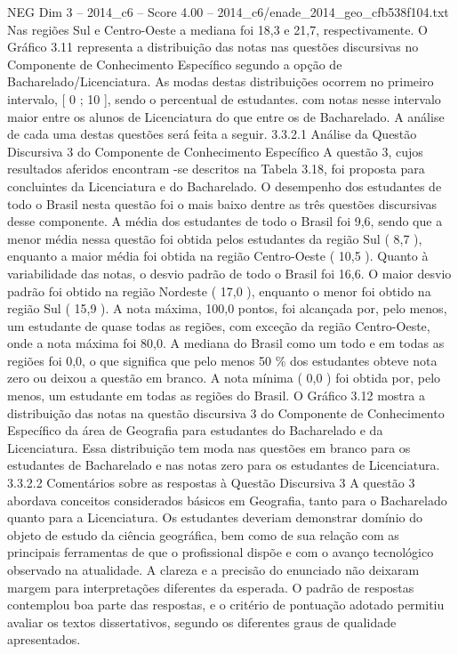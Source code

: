 \begin{textsample}{NEG Dim 3 – 2014\_c6 – Score 4.00 – 2014\_c6/enade\_2014\_geo\_cfb538f104.txt}
Nas regiões Sul e Centro-Oeste a mediana foi 18,3 e 21,7, respectivamente.
O Gráfico 3.11 representa a distribuição das notas nas questões discursivas no Componente de Conhecimento Específico segundo a opção de Bacharelado/Licenciatura.
As modas destas distribuições ocorrem no primeiro intervalo, [ 0 ; 10 ], sendo o percentual de estudantes. com notas nesse intervalo maior entre os alunos de Licenciatura do que entre os de Bacharelado.
A análise de cada uma destas questões será feita a seguir. 3.3.2.1 Análise da Questão Discursiva 3 do Componente de Conhecimento Específico A questão 3, cujos resultados aferidos encontram -se descritos na Tabela 3.18, foi proposta para concluintes da Licenciatura e do Bacharelado.
O desempenho dos estudantes de todo o Brasil nesta questão foi o mais baixo dentre as três questões discursivas desse componente.
A média dos estudantes de todo o Brasil foi 9,6, sendo que a menor média nessa questão foi obtida pelos estudantes da região Sul ( 8,7 ), enquanto a maior média foi obtida na região Centro-Oeste ( 10,5 ).
Quanto à variabilidade das notas, o desvio padrão de todo o Brasil foi 16,6.
O maior desvio padrão foi obtido na região Nordeste ( 17,0 ), enquanto o menor foi obtido na região Sul ( 15,9 ).
A nota máxima, 100,0 pontos, foi alcançada por, pelo menos, um estudante de quase todas as regiões, com exceção da região Centro-Oeste, onde a nota máxima foi 80,0.
A mediana do Brasil como um todo e em todas as regiões foi 0,0, o que significa que pelo menos 50 \% dos estudantes obteve nota zero ou deixou a questão em branco.
A nota mínima ( 0,0 ) foi obtida por, pelo menos, um estudante em todas as regiões do Brasil.
O Gráfico 3.12 mostra a distribuição das notas na questão discursiva 3 do Componente de Conhecimento Específico da área de Geografia para estudantes do Bacharelado e da Licenciatura.
Essa distribuição tem moda nas questões em branco para os estudantes de Bacharelado e nas notas zero para os estudantes de Licenciatura. 3.3.2.2 Comentários sobre as respostas à Questão Discursiva 3 A questão 3 abordava conceitos considerados básicos em Geografia, tanto para o Bacharelado quanto para a Licenciatura.
Os estudantes deveriam demonstrar domínio do objeto de estudo da ciência geográfica, bem como de sua relação com as principais ferramentas de que o profissional dispõe e com o avanço tecnológico observado na atualidade.
A clareza e a precisão do enunciado não deixaram margem para interpretações diferentes da esperada.
O padrão de respostas contemplou boa parte das respostas, e o critério de pontuação adotado permitiu avaliar os textos dissertativos, segundo os diferentes graus de qualidade apresentados.

\end{textsample}
